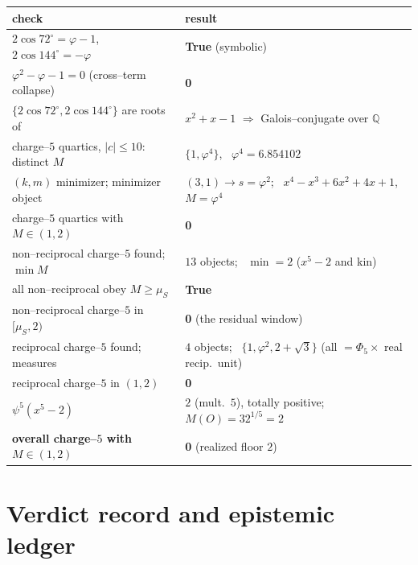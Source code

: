 \documentclass[11pt]{article}
\newcommand{\Q}{\mathbb{Q}}
\newcommand{\Mah}{M}
\newcommand{\muS}{\mu_S}
\theoremstyle{plain}
\theoremstyle{definition}
\theoremstyle{remark}
\begin{document}
\begin{center}\small
\begin{tabular}{ll}
\toprule
check & result\\
\midrule
$2\cos72^\circ=\varphi-1$, \ $2\cos144^\circ=-\varphi$ & \textbf{True} (symbolic)\\
$\varphi^2-\varphi-1=0$ (cross--term collapse) & \textbf{0}\\
$\{2\cos72^\circ,2\cos144^\circ\}$ are roots of & $x^2+x-1$ $\Rightarrow$ Galois--conjugate over $\Q$\\
charge--$5$ quartics, $|c|\le10$: distinct $\Mah$ & $\{1,\varphi^4\}$, \ $\varphi^4=6.854102$\\
$(k,m)$ minimizer; minimizer object & $(3,1)\to s=\varphi^2$; \ $x^4-x^3+6x^2+4x+1$, $\Mah=\varphi^4$\\
charge--$5$ quartics with $\Mah\in(1,2)$ & \textbf{0}\\
non--reciprocal charge--$5$ found; $\min\Mah$ & $13$ objects; \ $\min=2$ ($x^5-2$ and kin)\\
all non--reciprocal obey $\Mah\ge\muS$ & \textbf{True}\\
non--reciprocal charge--$5$ in $[\muS,2)$ & \textbf{0} (the residual window)\\
reciprocal charge--$5$ found; measures & $4$ objects; \ $\{1,\varphi^2,2+\sqrt3\}$ (all $=\Phi_5\times$ real recip.\ unit)\\
reciprocal charge--$5$ in $(1,2)$ & \textbf{0}\\
$\psi^5(x^5-2)$ & $2$ (mult.\ $5$), totally positive; $\Mah(O)=32^{1/5}=2$\\
\textbf{overall charge--$5$ with $\Mah\in(1,2)$} & \textbf{0} \quad (realized floor $2$)\\
\bottomrule
\end{tabular}
\end{center}

\section{Verdict record and epistemic ledger}
\end{document}
